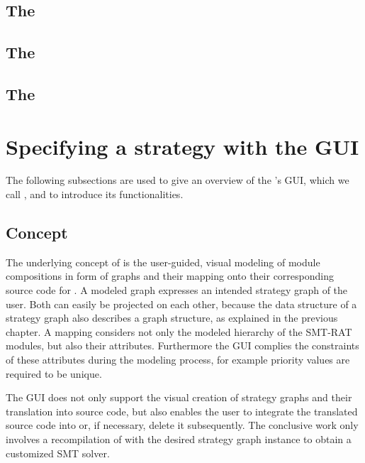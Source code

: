 \subsection{The \gbModuleClass}

\subsection{The \vsModuleClass}

\subsection{The \cadModuleClass}


\section{Specifying a strategy with the GUI}

The following subsections are used to give an overview of the 
 \smtrat's GUI, which we call \smtxrat, and to introduce its functionalities.

\subsection{Concept}
\label{sec:concept_of_smt-xrat}
The underlying concept of \smtxrat is the user-guided, visual 
modeling of module compositions in form of graphs and their 
mapping onto their corresponding source code for \smtrat. A 
modeled graph expresses an intended strategy graph of the user. 
Both can easily be projected on each other, because the data 
structure of a strategy graph also describes a graph structure, 
as explained in the previous chapter. A mapping considers not 
only the modeled hierarchy of the SMT-RAT modules, but also 
their attributes. Furthermore the GUI complies the constraints 
of these attributes during the modeling process, for example 
priority values are required to be unique.

The GUI does not only support the visual creation of strategy 
graphs and their translation into source code, but also enables 
the user to integrate the translated source code into \smtrat or, 
if necessary, delete it subsequently. The conclusive work only 
involves a recompilation of \smtrat with the desired strategy 
graph instance to obtain a customized SMT solver.

